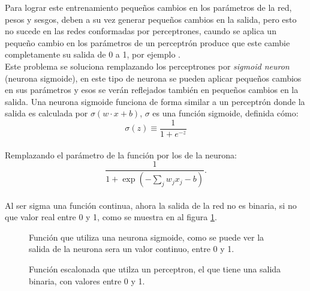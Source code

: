 \documentclass{iccmemoria}
\begin{document}
Para lograr este entrenamiento pequeños cambios en los parámetros de la red, pesos y sesgos, deben a su vez generar pequeños cambios en la salida, pero esto no sucede en las redes conformadas por perceptrones, caundo se aplica un pequeño cambio en los parámetros de un perceptrón produce que este cambie completamente su salida de 0 a 1, por ejemplo \cite{neuralNet}.\\

Este problema se soluciona remplazando los perceptrones por \emph{sigmoid neuron} (neurona sigmoide), en este tipo de neurona se pueden aplicar pequeños cambios en sus parámetros y esos se verán reflejados también en pequeños cambios en la salida. Una neurona sigmoide funciona de forma similar a un perceptrón donde la salida es calculada por $ \sigma(w \cdot x + b)$, $\sigma$ es una función sigmoide, definida cómo:\\

\begin{equation}
	\sigma(z) \equiv \frac{1}{1+e^{-z}}
\end{equation}\\

Remplazando el parámetro de la función por los de la neurona:\\

\begin{equation} 
  \frac{1}{1+\exp(-\sum_j w_j x_j-b)}.
\end{equation}\\

Al ser sigma una función continua, ahora la salida de la red no es binaria, si no que valor real entre 0 y 1, como se muestra en al figura \ref{fig:sigmoid}.\\

\begin{figure}[H]
  \centering
  \begin{small}
  
  \end{small}
  \caption{Función que utiliza una neurona sigmoide, como se puede ver la salida de la neurona sera un valor continuo, entre 0 y 1.}
  \label{fig:sigmoid}
\end{figure}

\begin{figure}[H]
  \centering
  \begin{small}
  
  \end{small}
  \caption{Función escalonada que utilza un perceptron, el que tiene una salida binaria, con valores entre 0 y 1.}
  \label{fig:step}
\end{figure}
\end{document}

